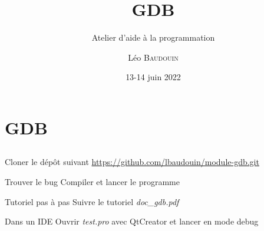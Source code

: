 \documentclass{beamer}
\title{GDB}
\subtitle{Atelier d'aide à la programmation}
\author{L\'eo \textsc{Baudouin}}
\institute{
  {\url{baudouin.leo @ gmail.com}}
}
\date{13-14 juin 2022}
\begin{document}
\begin{frame}
  \titlepage
\end{frame}

\section{GDB}
\subsection{}

\begin{frame}{}

\begin{block}{Cloner le dép\^ot suivant}
\url{https://github.com/lbaudouin/module-gdb.git}
\end{block}

\begin{block}{Trouver le bug}
Compiler et lancer le programme
\end{block}

\begin{block}{Tutoriel pas à pas}
Suivre le tutoriel \emph{doc\_gdb.pdf}\footnotemark
\end{block}

\begin{block}{Dans un IDE}
Ouvrir \emph{test.pro} avec QtCreator et lancer en mode debug
\end{block}


\end{frame}


\end{document}
